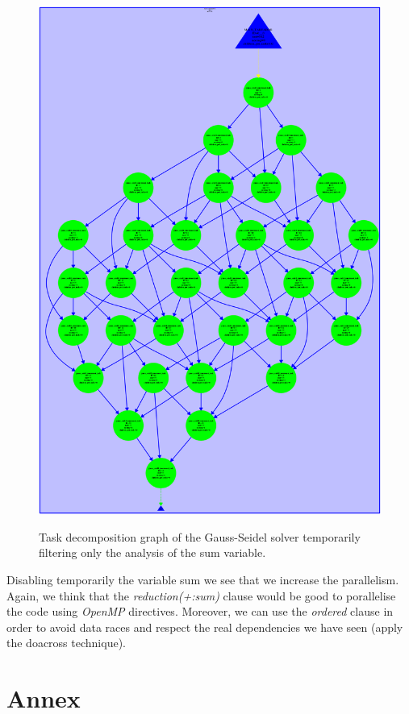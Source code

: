 \documentclass[12pt, a4paper]{article}
\begin{document}
\begin{figure}[H]
	\centering
	\includegraphics[scale=0.20]{./images/tareador-gauss-seidel-2b-sum}
	\label{fig:TDGGauss-Seidel-disable-sum}
	\caption{Task decomposition graph of the Gauss-Seidel solver temporarily filtering only the analysis of the sum variable.}
\end{figure}

Disabling temporarily the variable sum we see that we increase the parallelism. Again, we think that the \textit{reduction(+:sum)} clause would be good to porallelise the code using \textit{OpenMP} directives. Moreover, we can use the \textit{ordered} clause in order to avoid data races and respect the real dependencies we have seen (apply the doacross technique).

\section{Annex}
\end{document}
